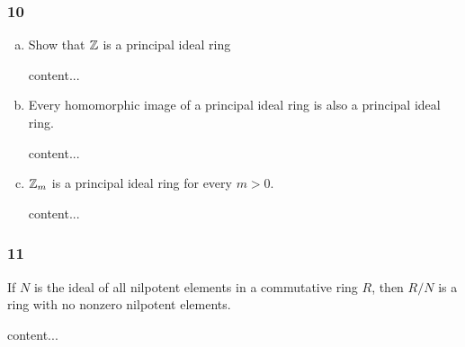 \subsubsection*{10}
\begin{enumerate}[(a)]
	\item 
	\begin{graybox}
		Show that $\mathbb{Z}$ is a principal ideal ring
	\end{graybox}
	\begin{solution}
		content...
	\end{solution}
	\item
	\begin{graybox}
		Every homomorphic image of a principal ideal ring is also a principal ideal ring.
	\end{graybox}
	\begin{solution}
		content...
	\end{solution}
	\item
	\begin{graybox}
		$\mathbb{Z}_m$ is a principal ideal ring for every $m > 0$.
	\end{graybox}
	\begin{solution}
		content...
	\end{solution}
\end{enumerate}

\subsubsection*{11}
\begin{graybox}
	If $N$ is the ideal of all nilpotent elements in a commutative ring $R$, then $R / N$ is a ring with no nonzero nilpotent elements.
\end{graybox}
\begin{solution}
	content...
\end{solution}

